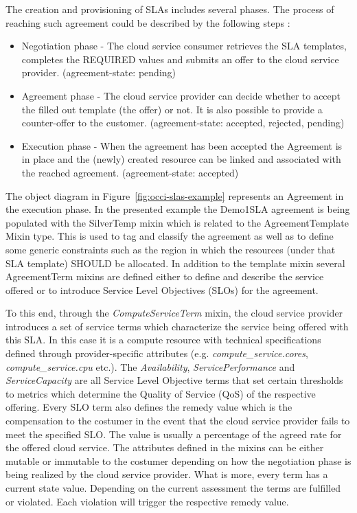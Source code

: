 \documentclass[10pt,a4paper]{article}
\begin{document}
The creation and provisioning of SLAs includes several phases.  The process of reaching such agreement could be described by the following steps :
\begin{itemize}
\item Negotiation phase - The cloud service consumer retrieves the SLA templates, completes the REQUIRED values and submits an offer to the cloud service provider. (agreement-state: pending)
\item Agreement phase - The cloud service provider can decide whether to accept the filled out template (the offer) or not. It is also possible to provide a counter-offer to the customer. (agreement-state: accepted, rejected, pending)
\item Execution phase - When the agreement has been accepted the Agreement is in place and the (newly) created resource can be linked and associated with the reached agreement. (agreement-state: accepted)
\end{itemize}
The object diagram in Figure~\ref{fig:occi-slas-example} represents an Agreement in the execution phase. In the presented example the Demo1SLA agreement is being populated with the SilverTemp mixin which is related to the AgreementTemplate Mixin type. This is used to tag and classify the agreement as well as to define some generic constraints such as the region in which the resources (under that SLA template) SHOULD be allocated. In addition to the template mixin several AgreementTerm mixins are defined either to define and describe the service offered or to introduce Service Level Objectives (SLOs) for the agreement.

To this end, through the \textit{ComputeServiceTerm} mixin, the cloud service provider introduces a set of service terms which characterize the service being offered with this SLA. In this case it is a compute resource with technical specifications defined through provider-specific attributes (e.g. \textit{compute\_service.cores}, \textit{compute\_service.cpu} etc.). The \textit{Availability}, \textit{ServicePerformance} and \textit{ServiceCapacity} are all Service Level Objective terms that set certain thresholds to metrics which determine the Quality of Service (QoS) of the respective offering. Every SLO term also defines the remedy value which is the compensation to the costumer in the event that the cloud service provider fails to meet the specified SLO. The value is usually a percentage of the agreed rate for the offered cloud service. The attributes defined in the mixins can be either mutable or immutable to the costumer depending on how the negotiation phase is being realized by the cloud service provider. What is more, every term has a current state value. Depending on the current assessment the terms are fulfilled or violated. Each violation will trigger the respective remedy value.
\end{document}
